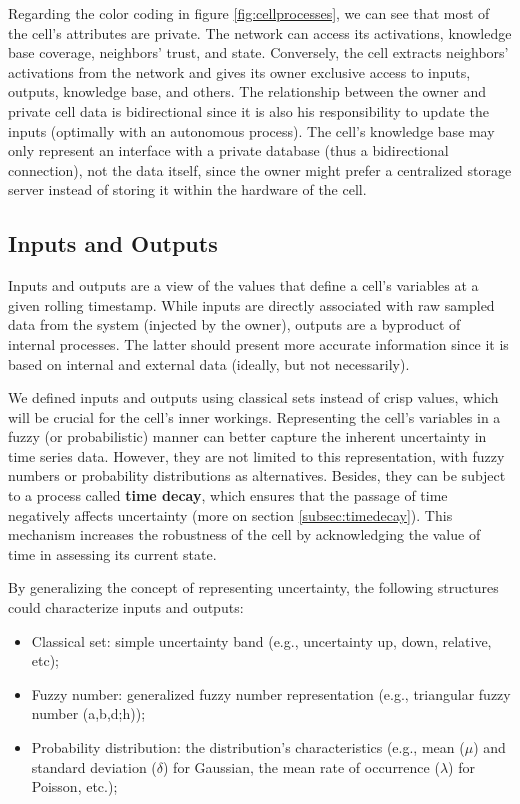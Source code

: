Regarding the color coding in figure \ref{fig:cellprocesses}, we can see that most of the cell's attributes are private. The network can access its activations, knowledge base coverage, neighbors' trust, and state. Conversely, the cell extracts neighbors' activations from the network and gives its owner exclusive access to inputs, outputs, knowledge base, and others. The relationship between the owner and private cell data is bidirectional since it is also his responsibility to update the inputs (optimally with an autonomous process). The cell's knowledge base may only represent an interface with a private database (thus a bidirectional connection), not the data itself, since the owner might prefer a centralized storage server instead of storing it within the hardware of the cell.

\subsection{Inputs and Outputs} \label{subsec:inout}

Inputs and outputs are a view of the values that define a cell's variables at a given rolling timestamp. While inputs are directly associated with raw sampled data from the system (injected by the owner), outputs are a byproduct of internal processes. The latter should present more accurate information since it is based on internal and external data (ideally, but not necessarily).

We defined inputs and outputs using classical sets instead of crisp values, which will be crucial for the cell's inner workings. Representing the cell's variables in a fuzzy (or probabilistic) manner can better capture the inherent uncertainty in time series data. However, they are not limited to this representation, with fuzzy numbers or probability distributions as alternatives. Besides, they can be subject to a process called \textbf{time decay}, which ensures that the passage of time negatively affects uncertainty (more on section \ref{subsec:timedecay}). This mechanism increases the robustness of the cell by acknowledging the value of time in assessing its current state.

By generalizing the concept of representing uncertainty, the following structures could characterize inputs and outputs:

\begin{itemize}
    \item Classical set: simple uncertainty band (e.g., uncertainty up, down, relative, etc);
    \item Fuzzy number: generalized fuzzy number representation \cite{Zhang2019} (e.g., triangular fuzzy number (a,b,d;h));
    \item Probability distribution: the distribution's characteristics (e.g., mean ($\mu$) and standard deviation ($\delta$) for Gaussian, the mean rate of occurrence ($\lambda$) for Poisson, etc.);
\end{itemize}

